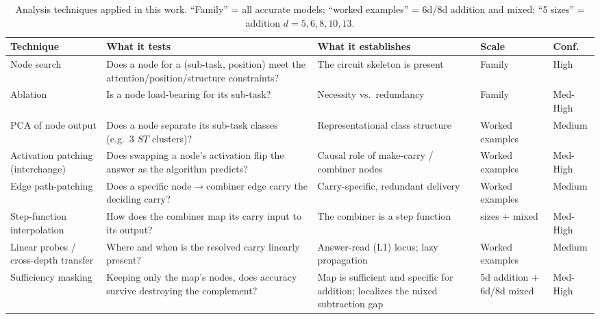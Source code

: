 \documentclass[11pt]{article}
\begin{document}
\begin{table}[h]
    \caption{Analysis techniques applied in this work. ``Family'' = all accurate models; ``worked examples'' = 6d/8d addition and mixed; ``5 sizes'' = addition $d = 5, 6, 8, 10, 13$.}
    \label{tab:Techniques}
    \vspace{0.1in}
    \centering
    \small
    \renewcommand{\arraystretch}{1.15}
    \begin{tabularx}{\textwidth}{|
        >{\hsize=0.85\hsize\raggedright\arraybackslash}X|
        >{\hsize=1.30\hsize\raggedright\arraybackslash}X|
        >{\hsize=1.30\hsize\raggedright\arraybackslash}X|
        >{\hsize=0.95\hsize\raggedright\arraybackslash}X|
        >{\hsize=0.60\hsize\raggedright\arraybackslash}X|}
        \hline
        \textbf{Technique} & \textbf{What it tests} & \textbf{What it establishes} & \textbf{Scale} & \textbf{Conf.} \\
        \hline
        Node search & Does a node for a (sub-task, position) meet the attention/position/structure constraints? & The circuit skeleton is present & Family & High \\
        \hline
        Ablation & Is a node load-bearing for its sub-task? & Necessity vs.\ redundancy & Family & Med-High \\
        \hline
        PCA of node output & Does a node separate its sub-task classes (e.g.\ 3 $ST$ clusters)? & Representational class structure & Worked examples & Medium \\
        \hline
        Activation patching (interchange) & Does swapping a node's activation flip the answer as the algorithm predicts? & Causal role of make-carry / combiner nodes & Worked examples & Med-High \\
        \hline
        Edge path-patching & Does a specific node$\rightarrow$combiner edge carry the deciding carry? & Carry-specific, redundant delivery & Worked examples & Medium \\
        \hline
        Step-function interpolation & How does the combiner map its carry input to its output? & The combiner is a step function & 5 sizes + mixed & Med-High \\
        \hline
        Linear probes / cross-depth transfer & Where and when is the resolved carry linearly present? & Answer-read (L1) locus; lazy propagation & Worked examples & Medium \\
        \hline
        Sufficiency masking & Keeping only the map's nodes, does accuracy survive destroying the complement? & Map is sufficient and specific for addition; localizes the mixed subtraction gap & 5d addition + 6d/8d mixed & Med-High \\

\end{tabularx}
\end{table}
\end{document}

